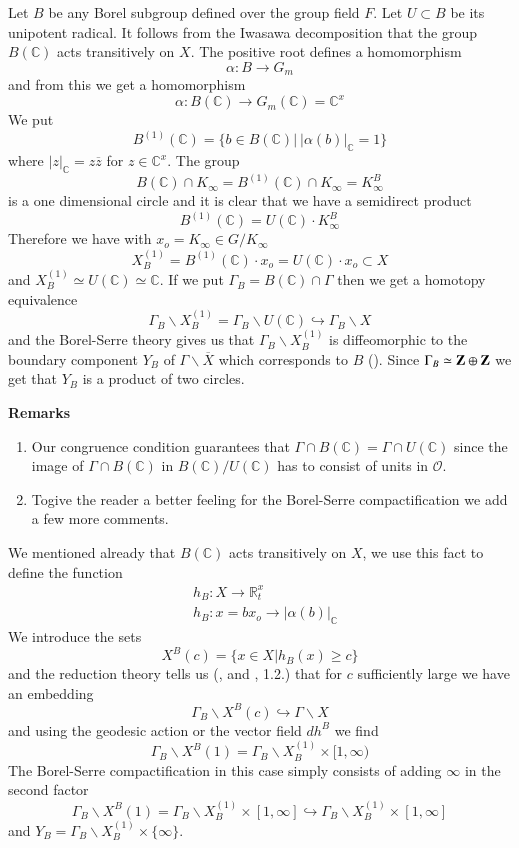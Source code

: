 Let $B$ be any Borel subgroup defined over the group field $F$. Let $U\subset B$ be its unipotent radical. It follows from the Iwasawa decomposition that the group $B(\mathbb{C})$ acts transitively on $X$. The positive root defines a homomorphism
$$
\alpha : B\to G_{m}
$$
and from this we get a homomorphism
$$
\alpha : B(\mathbb{C})\to G_{m}(\mathbb{C})=\mathbb{C}^{x}
$$
We put
$$
B^{(1)}(\mathbb{C})=\{b\in B(\mathbb{C})|~|\alpha (b)|_{\mathbb{C}}=1\}
$$
where $|z|_{\mathbb{C}}=z\overline{z}$ for $z\in \mathbb{C}^{x}$. The group
$$
B(\mathbb{C})\cap K_{\infty}=B^{(1)}(\mathbb{C})\cap K_{\infty}=K^{B}_{\infty}
$$
is a one dimensional circle and it is clear that we have a semidirect product 
$$
B^{(1)}(\mathbb{C})=U(\mathbb{C})\cdot K^{B}_{\infty}
$$
Therefore we have with $x_{o}=K_{\infty}\in G/K_{\infty}$
$$
X^{(1)}_{B}=B^{(1)}(\mathbb{C})\cdot x_{o}=U(\mathbb{C})\cdot x_{o}\subset X
$$
and $X^{(1)}_{B}\simeq U(\mathbb{C})\simeq \mathbb{C}$. If we put $\Gamma_{B}=B(\mathbb{C})\cap \Gamma$ then we get a homotopy equivalence
$$
\Gamma_{B}\backslash X_{B}^{(1)}=\Gamma_{B}\backslash U(\mathbb{C})\hookrightarrow \Gamma_{B}\backslash X
$$
and the Borel-Serre theory gives us that $\Gamma_{B}\backslash X^{(1)}_{B}$ is diffeomorphic to the boundary component $Y_{B}$ of $\Gamma\backslash \overline{X}$ which corresponds to $B$ (\cite{art2-key3}). Since $\Gamma_{B}\simeq \mathbf{Z}\oplus \mathbf{Z}$ we get that $Y_{B}$ is a product of two circles.

\bigskip
\noindent
{\bf Remarks}
\begin{enumerate}
\renewcommand{\labelenumi}{(\theenumi)}
\item Our congruence condition guarantees that $\Gamma\cap B(\mathbb{C})=\Gamma\cap U(\mathbb{C})$ since the image of $\Gamma\cap B(\mathbb{C})$ in $B(\mathbb{C})/U(\mathbb{C})$ has to consist of units in $\mathscr{O}$.

\item To\pageoriginale give the reader a better feeling for the Borel-Serre compactification we add a few more comments.
\end{enumerate}

We mentioned already that $B(\mathbb{C})$ acts transitively on $X$, we use this fact to define the function
\begin{align*}
& h_{B}:X\to \mathbb{R}^{x}_{t}\\
& h_{B}:x=bx_{o}\to |\alpha(b)|_{\mathbb{C}}
\end{align*}
We introduce the sets
$$
X^{B}(c)=\{x\in X|h_{B}(x)\geq c\}
$$
and the reduction theory tells us (\cite{art2-key1}, and \cite{art2-key5}, 1.2.) that for $c$ sufficiently large we have an embedding
$$
\Gamma_{B}\backslash X^{B}(c)\hookrightarrow \Gamma\backslash X
$$
and using the geodesic action or the vector field $dh^{B}$ we find
$$
\Gamma_{B}\backslash X^{B}(1)=\Gamma_{B}\backslash X^{(1)}_{B}\times [1,\infty)
$$
The Borel-Serre compactification in this case simply consists of adding $\infty$ in the second factor
$$
\Gamma_{B}\backslash X^{B}(1)=\Gamma_{B}\backslash X^{(1)}_{B}\times [1,\infty]\hookrightarrow \Gamma_{B}\backslash X^{(1)}_{B}\times [1,\infty]
$$
and $Y_{B}=\Gamma_{B}\backslash X^{(1)}_{B}\times \{\infty\}$.

